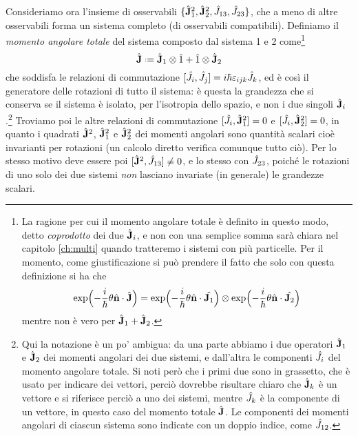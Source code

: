 Consideriamo ora l'insieme di osservabili $\{\hat{\mathbf{J}}_1^2,\hat{\mathbf{J}}_2^2,\hat{J}_{13},\hat{J}_{23}\}$, che a meno di altre osservabili forma un sistema completo (di osservabili compatibili).
Definiamo il \emph{momento angolare totale} del sistema composto dal sistema 1 e 2 come\footnote{
    La ragione per cui il momento angolare totale è definito in questo modo, detto \emph{coprodotto} dei due $\hat{\mathbf{J}}_i$, e non con una semplice somma sarà chiara nel capitolo \ref{ch:multi} quando tratteremo i sistemi con più particelle.
    Per il momento, come giustificazione si può prendere il fatto che solo con questa definizione si ha che
    \begin{equation}
        \exp\Bigl(-\frac{i}{\hbar}\theta{\hat{\mathbf{n}}}\cdot{\hat{\mathbf{J}}}\Bigr)=
        \exp\Bigl(-\frac{i}{\hbar}\theta{\hat{\mathbf{n}}}\cdot{\hat{\mathbf{J}_1}}\Bigr) \otimes \exp\Bigl(-\frac{i}{\hbar}\theta{\hat{\mathbf{n}}}\cdot{\hat{\mathbf{J}_2}}\Bigr)
    \end{equation}
    mentre non è vero per $\hat{\mathbf{J}}_1+\hat{\mathbf{J}}_2$.
}
\begin{equation}
    \op{\vec J} \defeq \op{\vec J}_1\otimes\op 1 + \op 1\otimes\op{\vec J}_2
    \label{eq:momento-angolare-totale}
\end{equation}
che soddisfa le relazioni di commutazione $[\hat{J}_i,\hat{J}_j]=i\hbar\varepsilon_{ijk}\hat{J}_k$, ed è cos\`i il generatore delle rotazioni di tutto il sistema: è questa la grandezza che si conserva se il sistema è isolato, per l'isotropia dello spazio, e non i due singoli $\hat{\mathbf{J}}_i$.\footnote{
	Qui la notazione è un po' ambigua: da una parte abbiamo i due operatori $\hat{\mathbf{J}}_1$ e $\hat{\mathbf{J}}_2$ dei momenti angolari dei due sistemi, e dall'altra le componenti $\hat{J}_i$ del momento angolare totale.
	Si noti però che i primi due sono in grassetto, che è usato per indicare dei vettori, perciò dovrebbe risultare chiaro che $\hat{\mathbf{J}}_k$ è un vettore e si riferisce perciò a uno dei sistemi, mentre $\hat{J}_k$ è la componente di un vettore, in questo caso del momento totale $\hat{\mathbf{J}}$.
	Le componenti dei momenti angolari di ciascun sistema sono indicate con un doppio indice, come $\hat{J}_{12}$.
}
Troviamo poi le altre relazioni di commutazione $[\hat{J}_i,\hat{\mathbf{J}}_1^2]=0$ e $[\hat{J}_i,\hat{\mathbf{J}}_2^2]=0$, in quanto i quadrati $\hat{\mathbf{J}}^2$, $\hat{\mathbf{J}}_1^2$ e $\hat{\mathbf{J}}_2^2$ dei momenti angolari sono quantità scalari cioè invarianti per rotazioni (un calcolo diretto verifica comunque tutto ciò).
Per lo stesso motivo deve essere poi $[\hat{\mathbf{J}}^2,\hat{J}_{13}]\ne 0$, e lo stesso con $\hat{J}_{23}$, poich\'e le rotazioni di uno solo dei due sistemi \emph{non} lasciano invariate (in generale) le grandezze scalari.
